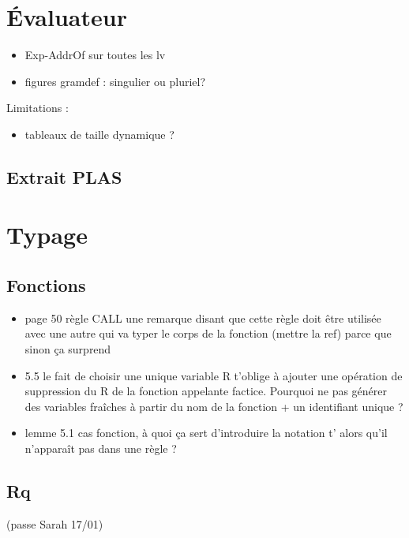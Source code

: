 
\section{Évaluateur} %

\begin{itemize}
\item Exp-AddrOf sur toutes les lv
\item figures gramdef : singulier ou pluriel?
\end{itemize}

Limitations :

\begin{itemize}
\item tableaux de taille dynamique ?
\end{itemize}

\subsection*{Extrait PLAS}




\section{Typage}%

\subsection*{Fonctions}

\begin{itemize}
\item
  page 50 règle CALL une remarque disant que cette règle doit être
  utilisée avec une autre qui va typer le corps de la fonction (mettre
  la ref) parce que sinon ça surprend
\item
  5.5 le fait de choisir une unique variable R t'oblige à ajouter une
  opération de suppression du R de la fonction appelante factice.
  Pourquoi ne pas générer des variables fraîches à partir du nom de la
  fonction + un identifiant unique ?
\item
  lemme 5.1 cas fonction, à quoi ça sert d'introduire la notation t'
  alors qu'il n'apparaît pas dans une règle ?
\end{itemize}

\subsection*{Rq}
(passe Sarah 17/01)

